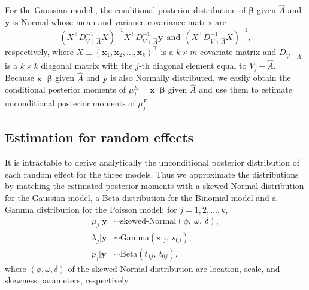 \documentclass[article]{jss}
\begin{document}
For the Gaussian model \citep{tang2011}, the conditional posterior distribution of $\boldsymbol{\beta}$ given $\hat{A}$ and $\boldsymbol{y}$ is Normal whose mean and variance-covariance matrix are
\begin{equation}
(X^\top D^{-1}_{V+\hat{A}} X)^{-1}X^\top D^{-1}_{V+\hat{A}}\boldsymbol{y}~~ \textrm{and}~~ (X^\top D^{-1}_{V+\hat{A}} X)^{-1},
\end{equation}
respectively, where $X\equiv (\boldsymbol{x}_1, \boldsymbol{x}_2, \ldots, \boldsymbol{x}_k)^\top$ is a $k \times m$ covariate matrix and $D_{V+\hat{A}}$ is a $k \times k$ diagonal matrix with the $j$-th diagonal element equal to $V_j+\hat{A}$. Because $\boldsymbol{x}^\top\boldsymbol{\beta}$ given $\hat{A}$ and $\boldsymbol{y}$ is also Normally distributed, we easily obtain the conditional posterior moments of $\mu^E_j=\boldsymbol{x}^\top\boldsymbol{\beta}$ given $\hat{A}$ and use them to estimate unconditional posterior moments of $\mu^E_j$.


\subsection{Estimation for random effects}
It is intractable to derive analytically the unconditional posterior
distribution of each random effect for the three models. Thus we approximate the
distributions by matching the estimated posterior moments with a skewed-Normal distribution \citep{azzalini1985class} for
the Gaussian model, a Beta distribution for the Binomial model and a Gamma distribution for the Poisson model; for $j=1, 2, \ldots, k$,
\begin{align}
\mu_j\vert\boldsymbol{y} &\sim \textrm{skewed-Normal}(\phi,~ \omega,~ \delta),\label{skewnormal}\\
\lambda_j\vert \boldsymbol{y} &\sim \textrm{Gamma}(s_{1j},~ s_{0j}),\label{gammapost}\\
p_j\vert \boldsymbol{y} &\sim \textrm{Beta}(t_{1j},~ t_{0j}),\label{betapost}
\end{align}
where $(\phi, \omega, \delta)$ of the skewed-Normal distribution  are location,  scale, and skewness parameters, respectively.
\end{document}
